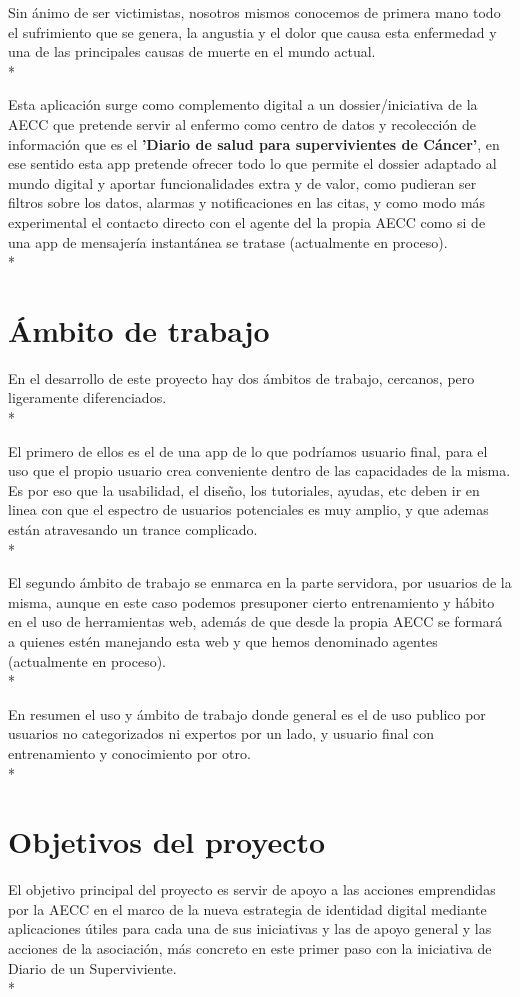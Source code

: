 \documentclass[../pfc.tex]{subfiles}
\begin{document}
Sin ánimo de ser victimistas, nosotros mismos conocemos de primera mano todo el sufrimiento que se genera, la angustia y el dolor que causa esta enfermedad y una de las principales causas de muerte en el mundo actual.\\*

Esta aplicación surge como complemento digital a un dossier/iniciativa de la AECC que pretende servir al enfermo como centro de datos y recolección de información que es el \textbf{'Diario de salud para supervivientes de Cáncer'}, en ese sentido esta app pretende ofrecer todo lo que permite el dossier adaptado al mundo digital y aportar funcionalidades extra y de valor, como pudieran ser filtros sobre los datos, alarmas y notificaciones en las citas, y como modo más experimental el contacto directo con el agente del la propia AECC como si de una app de mensajería instantánea se tratase (actualmente en proceso). \\*


\section{Ámbito de trabajo}

En el desarrollo de este proyecto hay dos ámbitos de trabajo, cercanos, pero ligeramente diferenciados.\\*

El primero de ellos es el de una app de lo que podríamos usuario final, para el uso que el propio usuario crea conveniente dentro de las capacidades de la misma. Es por eso que la usabilidad, el diseño, los tutoriales, ayudas, etc deben ir en linea con que el espectro de usuarios potenciales es muy amplio, y que ademas están atravesando un trance complicado.\\*

El segundo ámbito de trabajo se enmarca en la parte servidora, por usuarios de la misma, aunque en este caso podemos presuponer cierto entrenamiento y hábito en el uso de herramientas web, además de que desde la propia AECC se formará a quienes estén manejando esta web y que hemos denominado agentes (actualmente en proceso).\\*

En resumen el uso y ámbito de trabajo donde general es el de uso publico por usuarios no categorizados ni expertos por un lado, y usuario final con entrenamiento y conocimiento por otro.\\*

\section{Objetivos del proyecto}
El objetivo principal del proyecto es servir de apoyo a las acciones emprendidas por la AECC en el marco de la nueva estrategia de identidad digital mediante aplicaciones útiles para cada una de sus iniciativas y las de apoyo general y las acciones de la asociación, más concreto en este primer paso con la iniciativa de Diario de un Superviviente.\\*
\end{document}
